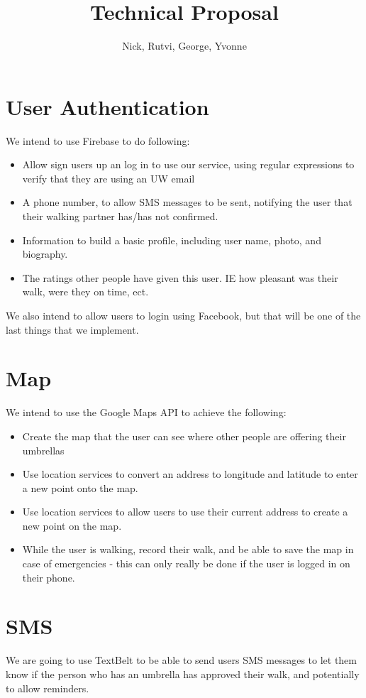 \documentclass[11pt,letterpaper]{article}
\author{Nick, Rutvi, George, Yvonne}
\title{Technical Proposal}
\begin{document}
\maketitle\section*{User Authentication}

We intend to use Firebase to do following: 
\begin{itemize}
\item Allow sign users up an log in to use our service, using regular expressions to verify that they are using an UW email
\item A phone number, to allow SMS messages to be sent, notifying the user that their walking partner has/has not confirmed.
\item Information to build a basic profile, including user name, photo, and biography.
\item The ratings other people have given this user. IE how pleasant was their walk, were they on time, ect.
\end{itemize}
We also intend to allow users to login using Facebook, but that will be one of the last things that we implement.

\section*{Map}
We intend to use the Google Maps API to achieve the following:
\begin{itemize}
\item Create the map that the user can see where other people are offering their umbrellas
\item Use location services to convert an address to longitude and latitude to enter a new point onto the map.
\item Use location services to allow users to use their current address to create a new point on the map.
\item While the user is walking, record their walk, and be able to save the map in case of emergencies - this can only really be done if the user is logged in on their phone.
\end{itemize}

\section*{SMS}

We are going to use TextBelt to be able to send users SMS messages to let them know if the person who has an umbrella has approved their walk, and potentially to allow reminders.
\end{document}
